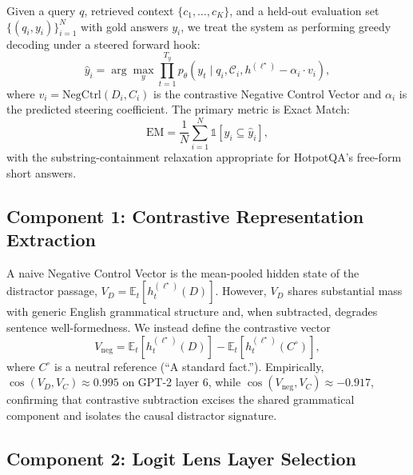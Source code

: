 \documentclass[conference]{IEEEtran}
\begin{document}
Given a query $q$, retrieved context $\{c_1,\ldots,c_K\}$, and a held-out evaluation set $\{(q_i, y_i)\}_{i=1}^N$ with gold answers $y_i$, we treat the system as performing greedy decoding under a steered forward hook:
\begin{equation}
    \hat{y}_i = \arg\max_{y} \prod_{t=1}^{T_y} p_\theta\!\left(y_t \mid q_i, \mathcal{C}_i, h^{(\ell^\star)} - \alpha_i \cdot v_i\right),
    \label{eq:steered}
\end{equation}
where $v_i = \text{NegCtrl}(D_i, C_i)$ is the contrastive Negative Control Vector and $\alpha_i$ is the predicted steering coefficient. The primary metric is Exact Match:
\begin{equation}
    \text{EM} = \frac{1}{N}\sum_{i=1}^N \mathbb{1}\!\left[y_i \subseteq \hat{y}_i\right],
\end{equation}
with the substring-containment relaxation appropriate for HotpotQA's free-form short answers.

\subsection{Component 1: Contrastive Representation Extraction}\label{sec:method-component1}

A naive Negative Control Vector is the mean-pooled hidden state of the distractor passage, $V_{D} = \mathbb{E}_t[h_t^{(\ell^\star)}(D)]$. However, $V_{D}$ shares substantial mass with generic English grammatical structure and, when subtracted, degrades sentence well-formedness. We instead define the contrastive vector
\begin{equation}
    V_{\text{neg}} = \mathbb{E}_t\!\left[h_t^{(\ell^\star)}(D)\right] - \mathbb{E}_t\!\left[h_t^{(\ell^\star)}(C^{\circ})\right],
    \label{eq:contrastive}
\end{equation}
where $C^{\circ}$ is a neutral reference (``A standard fact.''). Empirically, $\cos(V_D, V_C) \approx 0.995$ on GPT-2 layer 6, while $\cos(V_{\text{neg}}, V_C) \approx -0.917$, confirming that contrastive subtraction excises the shared grammatical component and isolates the causal distractor signature.

\subsection{Component 2: Logit Lens Layer Selection}
\end{document}
